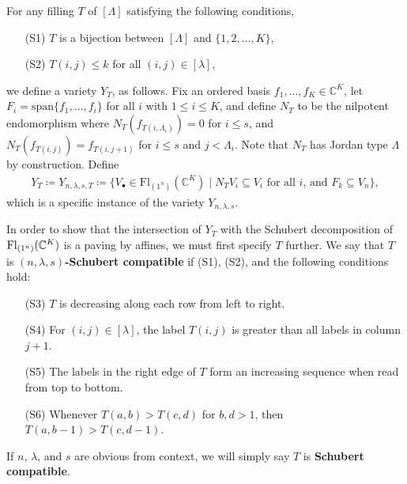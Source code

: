 \documentclass[12pt]{amsart}
\newcommand{\vspan}{\mathrm{span}}
\newcommand{\Fl}{\mathrm{Fl}}
\newcommand{\la}{\lambda}
\begin{document}
For any filling $T$ of $[\Lambda]$ satisfying the following conditions,
\begin{enumerate}
\item[(S1)] $T$ is a bijection between $[\Lambda]$ and $\{1,2,\dots, K\}$,
\item[(S2)] $T(i,j)\leq k$ for all $(i,j)\in [\lambda]$,
\end{enumerate}
we define a variety $Y_{T}$, as follows.
Fix an ordered basis $f_1,\ldots,f_K\in \mathbb{C}^K$, let $F_i=\vspan\{f_1,\ldots,f_i\}$ for all $i$ with $1\leq i\leq K$, and  define $N_T$ to be the nilpotent endomorphism
where $N_T(f_{T(i,\Lambda_i)}) = 0$ for $i\leq s$, and  $N_T(f_{T(i,j)})=f_{T(i,j+1)}$ for $i\leq s$ and $j<\Lambda_i$.  Note that $N_T$ has Jordan type
$\Lambda$ by construction.  
Define
\begin{align}
    Y_T \coloneqq Y_{n,\lambda,s,T}\coloneqq \{V_\bullet\in\Fl_{(1^n)}(\mathbb{C}^K) \mid N_TV_i\subseteq V_i\text{ for all } i\text{, and } F_k\subseteq V_n\},
\end{align}
which is a specific instance of the variety $Y_{n,\la,s}$.

In order to show that the intersection of $Y_{T}$ with the Schubert decomposition of $\Fl_{(1^n)}(\bC^K)$ is a paving by affines,
we must first specify $T$ further. 
We say that $T$ is {\bf $(n,\lambda,s)$-Schubert compatible} if (S1), (S2), and the following conditions hold:
\begin{enumerate}
\item[(S3)] $T$ is decreasing along each row from left to right.%
\item[(S4)] For $(i,j)\in [\lambda]$, the label $T(i,j)$ is greater than all labels in column $j+1$. %
\item[(S5)] The labels in the right edge of $T$ form an increasing sequence when read from top to bottom.%
\item[(S6)] Whenever $T(a,b)>T(c,d)$ for $b,d>1$, then $T(a,b-1)>T(c,d-1)$.
\end{enumerate}
If $n$, $\lambda$, and $s$ are obvious from context, we will simply say $T$ is {\bf Schubert compatible}.

\end{document}
